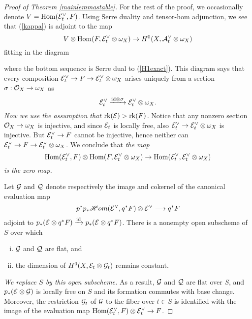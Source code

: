 \documentclass[letterpaper,12pt]{amsart}
\theoremstyle{remark}
\begin{document}
\begin{proof}[Proof of Theorem \ref{mainlemmastable}]
For the rest of the proof, we occasionally denote $V = \mathrm{Hom}(\mathcal{E}_t^\vee, F)$. Using Serre duality and tensor-hom adjunction, we see that (\ref{kappa}) is adjoint to the map
\[ V \otimes \mathrm{Hom}(F, \mathcal{E}_t^\vee \otimes \omega_X) \to H^0(X, \mathcal{A}_t^\vee \otimes \omega_X) \]
fitting in the diagram
\begin{center}
\end{center}
where the bottom sequence is Serre dual to (\ref{H1exact}). This diagram says that every composition $\mathcal{E}_t^\vee \to F \to \mathcal{E}_t^\vee \otimes \omega_X$ arises uniquely from a section $\sigma: \mathcal{O}_X \to \omega_X$ as 
\[ \mathcal{E}_t^\vee \xrightarrow{\mathrm{id} \otimes \sigma} \mathcal{E}_t^\vee \otimes \omega_X. \] 
\emph{Now we use the assumption that $\operatorname{\mathrm{rk}}(\mathcal{E}) > \operatorname{\mathrm{rk}}(F)$.} Notice that any nonzero section $\mathcal{O}_X \to \omega_X$ is injective, and since $\mathcal{E}_t$ is locally free, also $\mathcal{E}_t^\vee \to \mathcal{E}_t^\vee \otimes \omega_X$ is injective. But $\mathcal{E}_t^\vee \to F$ cannot be injective, hence neither can $\mathcal{E}_t^\vee \to F \to \mathcal{E}_t^\vee \otimes \omega_X$. We conclude that \emph{the map}
\[ \mathrm{Hom}(\mathcal{E}_t^\vee, F) \otimes \mathrm{Hom}(F, \mathcal{E}_t^\vee \otimes \omega_X) \to \mathrm{Hom}(\mathcal{E}_t^\vee, \mathcal{E}_t^\vee \otimes \omega_X) \]
\emph{is the zero map.}

Let $\mathcal{G}$ and $\mathcal{Q}$ denote respectively the image and cokernel of the canonical evaluation map
\[ p^*p_*\mathscr{H}om(\mathcal{E}^\vee, q^*F) \otimes \mathcal{E}^\vee \longrightarrow q^*F \]
adjoint to $p_*(\mathcal{E} \otimes q^*F) \xrightarrow{\mathrm{id}} p_*(\mathcal{E} \otimes q^*F)$. There is a nonempty open subscheme of $S$ over which 
\begin{enumerate}[(i)]
    \item $\mathcal{G}$ and $\mathcal{Q}$ are flat, and
    \item the dimension of $H^0(X, \mathcal{E}_t \otimes \mathcal{G}_t)$ remains constant.
\end{enumerate} 
\emph{We replace $S$ by this open subscheme.} As a result, $\mathcal{G}$ and $\mathcal{Q}$ are flat over $S$, and $p_*(\mathcal{E} \otimes \mathcal{G})$ is locally free on $S$ and its formation commutes with base change. Moreover, the restriction $\mathcal{G}_t$ of $\mathcal{G}$ to the fiber over $t \in S$ is identified with the image of the evaluation map $\mathrm{Hom}(\mathcal{E}_t^\vee, F) \otimes \mathcal{E}_t^\vee \to F$. 


\end{proof}
\end{document}
